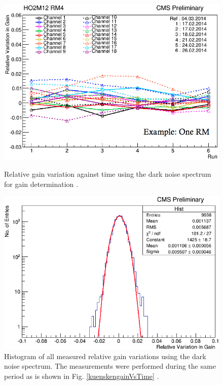 \begin{figure}[htbp]
\centering
\begin{minipage}[t]{0.475\textwidth}
\includegraphics[width=\textwidth]{Figures/kuensken/gainOverTime.png}
\caption{Relative gain variation against time using the dark noise spectrum for gain determination \cite{kuenskenCalor}.}
\label{kuenskengainVsTime}
\end{minipage}
\hspace{0.5cm}
\begin{minipage}[t]{0.475\textwidth}
\includegraphics[width=\textwidth]{Figures/kuensken/gainTotal.png}
\caption{Histogram of all measured relative gain variations using the dark noise spectrum. The measurements were performed during the same period as is shown in Fig. \ref{kuenskengainVsTime} \cite{kuenskenCalor}.}
\label{kuenskengainHist}
\end{minipage}
\end{figure}
